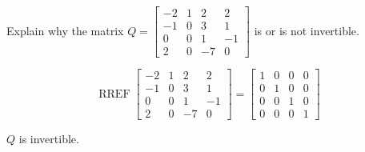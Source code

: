 
\begin{exerciseStatement}


Explain why the matrix \(Q= \left[\begin{array}{cccc}
-2 & 1 & 2 & 2 \\
-1 & 0 & 3 & 1 \\
0 & 0 & 1 & -1 \\
2 & 0 & -7 & 0
\end{array}\right] \) is or is not invertible.


\end{exerciseStatement}
    
\begin{exerciseAnswer} 


\[\operatorname{RREF} \left[\begin{array}{cccc}
-2 & 1 & 2 & 2 \\
-1 & 0 & 3 & 1 \\
0 & 0 & 1 & -1 \\
2 & 0 & -7 & 0
\end{array}\right] = \left[\begin{array}{cccc}
1 & 0 & 0 & 0 \\
0 & 1 & 0 & 0 \\
0 & 0 & 1 & 0 \\
0 & 0 & 0 & 1
\end{array}\right] \]

\(Q\) is invertible.
\end{exerciseAnswer}
    
